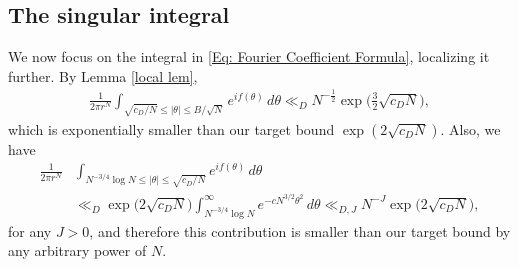 \documentclass[11pt]{amsart}
\numberwithin{equation}{section}
\theoremstyle{remark}
\begin{document}
\subsection{The singular integral}
We now focus on the integral in \eqref{Eq: Fourier Coefficient Formula}, localizing it further. By Lemma \ref{local lem},
\begin{align*}
\frac{1}{2 \pi r^N}\int_{\sqrt{c_D/N}\leq |\theta|\leq B/\sqrt{N}}e^{if(\theta)} \, d\theta
\ll_D N^{-\frac12}\exp\Big(\frac{3}{2}\sqrt{c_DN}\Big),
\end{align*}
which is exponentially smaller than our target bound $\exp(2\sqrt{c_DN})$. Also, we have
\begin{align*}
\frac{1}{2 \pi r^N}&\int_{N^{-3/4}\log N \leq |\theta|\leq \sqrt{c_D/N}}e^{if(\theta)} \, d\theta \\
&\ll_D
\exp\big(2\sqrt{c_DN}\big)
\int_{N^{-3/4}\log N}^\infty e^{-cN^{3/2}\theta^2}\, d\theta \ll_{D,J}
N^{-J} \exp\big(2\sqrt{c_DN}\big),
\end{align*}
for any $J>0$, and therefore this contribution is smaller than our target bound by any arbitrary power of $N$.
\end{document}
